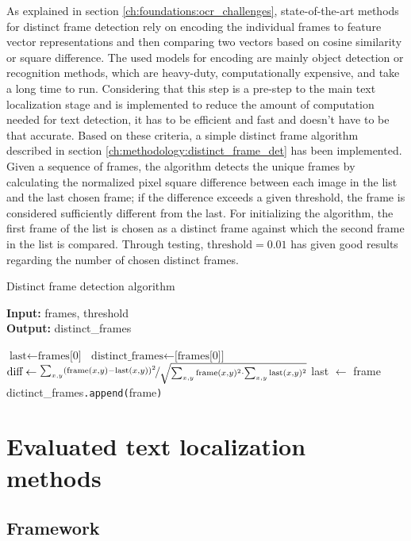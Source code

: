 As explained in section \ref{ch:foundations:ocr_challenges}, state-of-the-art methods for distinct frame detection rely on encoding the individual frames to feature vector representations and then comparing two vectors based on cosine similarity or square difference. The used models for encoding are mainly object detection or recognition methods, which are heavy-duty, computationally expensive, and take a long time to run. Considering that this step is a pre-step to the main text localization stage and is implemented to reduce the amount of computation needed for text detection, it has to be efficient and fast and doesn't have to be that accurate. Based on these criteria, a simple distinct frame algorithm described in section \ref{ch:methodology:distinct_frame_det} has been implemented. Given a sequence of frames, the algorithm detects the unique frames by calculating the normalized pixel square difference between each image in the list and the last chosen frame; if the difference exceeds a given threshold, the frame is considered sufficiently different from the last. For initializing the algorithm, the first frame of the list is chosen as a distinct frame against which the second frame in the list is compared. Through testing, $\text{threshold} = 0.01$ has given good results regarding the number of chosen distinct frames.

\begin{algorithm}
\caption{Distinct frame detection algorithm}\label{ch:methodology:distinct_frame_det}
\textbf{Input:} frames, threshold \\
\textbf{Output:} distinct\_frames 
\begin{algorithmic}
\State $\text{last} \gets \text{frames[0]}$
\State $\text{distinct\_frames} \gets \text{[frames[0]]}$
\State $\text{diff} \gets \nicefrac{\sum_{x,y} (\text{frame}(x,y)-\text{last}(x,y))^2}{\sqrt{\sum_{ x,y}\text{frame}(x,y)^2 \cdot \sum_{x,y} \text{last}(x,y)^2}}$
    \State last $\gets$ frame
    \State dictinct\_frames\texttt{.append(}frame\texttt{)}
\EndIf
\EndFor
\end{algorithmic}
\end{algorithm}

\section{Evaluated text localization methods}
\subsection{Framework}

